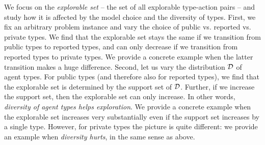 We focus on the \emph{explorable set} -- the set of all explorable type-action pairs -- and study how  it is affected by the model choice and the diversity of types. First, we fix an arbitrary problem instance and vary the choice of public vs. reported vs. private types. We find that the explorable set stays the same if we transition from public types to reported types, and can only decrease if we transition from reported types to private types. We provide a concrete example when the latter transition makes a huge difference. Second, let us vary the distribution $\mathcal{D}$ of agent types. For public types (and therefore also for reported types), we find that the explorable set is determined by the support set of $\mathcal{D}$. Further, if we increase the support set, then the explorable set can only increase. In other words, \emph{diversity of agent types helps exploration}. We provide a concrete example when the explorable set increases very substantially even if the support set increases by a single type. However, for private types the picture is quite different: we provide an example when \emph{diversity hurts}, in the same sense as above. 